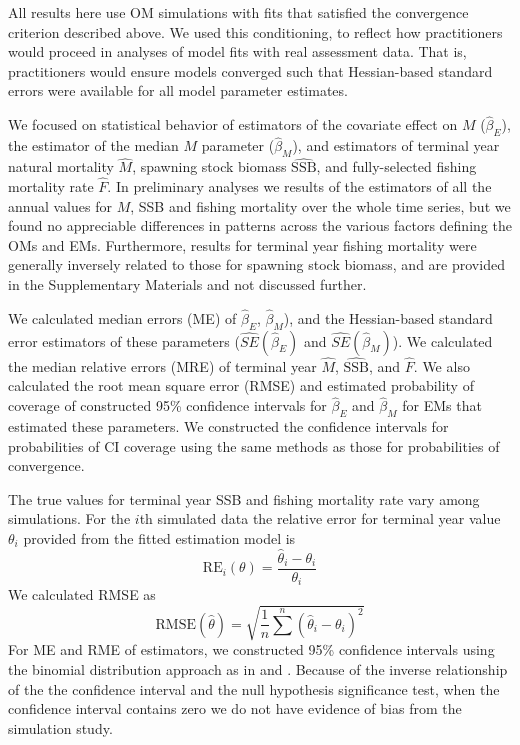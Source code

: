 \documentclass[
  12pt,
]{article}
\begin{document}
All results here use OM simulations with fits that satisfied the convergence criterion described above. We used this conditioning, to reflect how practitioners would proceed in analyses of model fits with real assessment data. That is, practitioners would ensure models converged such that Hessian-based standard errors were available for all model parameter estimates.

We focused on statistical behavior of estimators of the covariate effect on \(M\) (\(\widehat \beta_E\)), the estimator of the median \(M\) parameter (\(\widehat \beta_M\)), and estimators of terminal year natural mortality \(\widehat M\), spawning stock biomass \(\widehat{\text{SSB}}\), and fully-selected fishing mortality rate \(\widehat F\). In preliminary analyses we results of the estimators of all the annual values for \(M\), SSB and fishing mortality over the whole time series, but we found no appreciable differences in patterns across the various factors defining the OMs and EMs. Furthermore, results for terminal year fishing mortality were generally inversely related to those for spawning stock biomass, and are provided in the Supplementary Materials and not discussed further.

We calculated median errors (ME) of \(\widehat \beta_E\), \(\widehat \beta_M\)), and the Hessian-based standard error estimators of these parameters (\(\widehat{SE}\left(\widehat \beta_E\right)\) and \(\widehat{SE}\left(\widehat \beta_M\right)\)). We calculated the median relative errors (MRE) of terminal year \(\widehat M\), \(\widehat{\text{SSB}}\), and \(\widehat F\). We also calculated the root mean square error (RMSE) and estimated probability of coverage of constructed 95\% confidence intervals for \(\widehat \beta_E\) and \(\widehat \beta_M\) for EMs that estimated these parameters. We constructed the confidence intervals for probabilities of CI coverage using the same methods as those for probabilities of convergence.

The true values for terminal year SSB and fishing mortality rate vary among simulations. For the \(i\)th simulated data the relative error for terminal year value \(\theta_i\) provided from the fitted estimation model is
\[
\text{RE}_i\left(\theta\right) = \frac{\widehat \theta_i - \theta_i}{\theta_i}
\]
We calculated RMSE as
\[
\text{RMSE}\left(\widehat \theta\right) = \sqrt{\frac{1}{n}\sum^n\left(\widehat \theta_i - \theta_i\right)^2}
\]
For ME and RME of estimators, we constructed 95\% confidence intervals using the binomial distribution approach as in \citet{stockmiller21} and \citet{milleretal_inreview1}. Because of the inverse relationship of the the confidence interval and the null hypothesis significance test, when the confidence interval contains zero we do not have evidence of bias from the simulation study.
\end{document}
